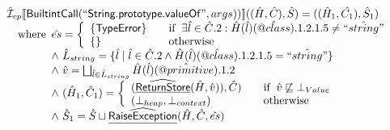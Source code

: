 \documentclass{article}
\makeatletter
\newcommand{\SF}[1]{\mbox{\textsf{#1}}}
\newcommand{\wherec}[1]{{\rm where}\begin{array}[t]{l}#1\end{array}}
\newcommand{\ifc}[1]{{\rm if}\begin{array}[t]{l}#1\end{array}}
\newcommand{\owc}{{\rm otherwise}}
\newcommand{\aI}{\hat{\mathcal{I}}}
\newcommand{\lbr}{\llbracket}
\newcommand{\rbr}{\rrbracket}
\newcommand{\ahf}[1]{\widehat{\underline{\sf #1}}}
\newcommand{\avarprop}[1]{\hat{@#1}}
\makeatother
\begin{document}
\[\begin{array}{l}
\aI _{cp}\lbr \SF{BuiltintCall}(``\SF{String.prototype.valueOf}",args))\rbr((\hat{H},\hat{C}), \hat{S})
  = ((\hat{H}_1, \hat{C_1}), \hat{S}_1)\\
\quad\wherec{
  \hat{es} = \left\{\begin{array}{l@{\quad\quad}l}
      \{ \SF{TypeError} \}
      & \ifc{\exists \hat{l} \in \hat{C}.2 : \hat{H}(\hat{l})(\avarprop{class}).1.2.1.5  \neq \hat{``string"}}\\
      \{ \}& \owc\\
    \end{array}\right.\\
  \land\ \hat{L}_{string} = \{ \hat{l} \mid \hat{l} \in \hat{C}.2 \land \hat{H}(\hat{l})(\avarprop{class}).1.2.1.5  = \hat{``string"}\}\\
  \land\ \hat{v} = \bigsqcup_{\hat{l} \in \hat{L}_{string}} \hat{H}(\hat{l})(\avarprop{primitive}).1.2\\
  \land\ (\hat{H}_1, \hat{C}_1) = 
    \left\{\begin{array}{l@{\quad\quad}l}
      (\ahf{ReturnStore}(\hat{H}, \hat{v})), \hat{C})
      & \ifc{\hat{v} \not\sqsubseteq \bot_{Value}}\\
      (\bot_{heap}, \bot_{context}) & \owc \\
    \end{array}\right.\\
  \land\ \hat{S}_1 = \hat{S} \sqcup \ahf{RaiseException}(\hat{H}, \hat{C}, \hat{es})\\
  }\\
\\\\





\end{array}\]
\end{document}
